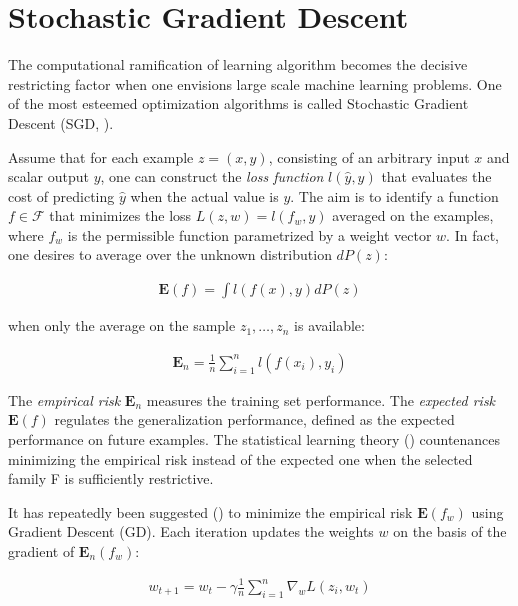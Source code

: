 \documentclass{pracamgr}
\numberwithin{equation}{section}
\begin{document}
\section{Stochastic Gradient Descent}

The computational ramification of learning algorithm becomes the decisive restricting factor when one envisions large scale machine learning problems. One of the most esteemed optimization algorithms is called Stochastic Gradient Descent (SGD, \citet{robbins1951stochastic}).

Assume that for each example $z = (x, y)$, consisting of an arbitrary input $x$ and scalar output $y$, one can construct the \textit{loss function} $l(\hat{y}, y)$ that evaluates the cost of predicting $\hat{y}$ when the actual value is $y$. The aim is to identify a function $f \in \mathcal{F}$ that minimizes the loss $L(z, w) = l(f_{w}, y)$ averaged on the examples, where $f_{w}$ is the permissible function parametrized by a weight vector $w$. In fact, one desires to average over the unknown distribution $dP(z)$:

\begin{align}
\mathbf{E} (f) = \int l(f(x), y) dP(z)
\end{align}

when only the average on the sample $z_{1}, \ldots, z_{n}$ is available:

\begin{align}
\mathbf{E}_{n} = \frac{1}{n} \sum\limits_{i=1}^{n} l(f(x_{i}), y_{i})
\end{align}

The \textit{empirical risk} $\mathbf{E}_{n}$ measures the training set performance. The \textit{expected risk} $\mathbf{E} (f)$ regulates the generalization performance, defined as the expected performance on future examples. The statistical learning theory (\citet{vapnik2015uniform}) countenances minimizing the empirical risk instead of the expected one when the selected family F is sufficiently restrictive.

It has repeatedly been suggested (\citet{rumelhart1985learning}) to minimize the empirical risk $\mathbf{E} (f_{w})$ using Gradient Descent (GD). Each iteration updates the weights $w$ on the basis of the gradient of $\mathbf{E}_{n} (f_{w})$:

\begin{align}
w_{t+1} = w_{t} - \gamma \frac{1}{n} \sum\limits_{i=1}^{n} \nabla_{w} L(z_{i}, w_{t})
\end{align}
\end{document}

